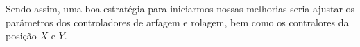 Sendo assim, uma boa estratégia para iniciarmos nossas melhorias seria ajustar os parâmetros dos controladores de arfagem e rolagem, bem como os contralores da posição \(X\) e \(Y\).









\printindex
